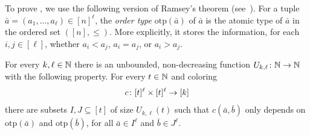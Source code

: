 To prove ,
we use the following version of Ramsey's theorem (see~\cite[full version, Lemma~4.4]{flip-breakability}).
\newcommand{\otp}{\mathrm{otp}}
For a tuple $\bar a=(a_1,\ldots,a_\ell)\in[n]^\ell$,
the \emph{order type} $\otp(\bar a)$ of 
$\bar a$ is the atomic type of $\bar a$ in the ordered set $([n],\le)$.
More explicitly, it stores the information, for each $i,j\in[\ell]$,
whether $a_i<a_j$, $a_i=a_j$, or $a_i>a_j$.



\begin{lemma}\label{lem:bip-ramsey}
    For every $k,\ell\in\mathbb N$
    there is an unbounded, non-decreasing function $U_{k,\ell}\colon\mathbb N\to\mathbb N$ with the following property.
For every $t\in\mathbb N$ and coloring 
    $$c\colon [t]^{\ell}\times [t]^{\ell}\to [k]$$
    there 
    are subsets $I,J\subseteq [t]$ of size $U_{k,\ell}(t)$ such that $c(\bar a,\bar b)$ only depends on $\otp(\bar a)$ and $\otp(\bar b)$, for all $\bar a\in I^\ell$ and $\bar b\in J^{\ell}$.
\end{lemma}



